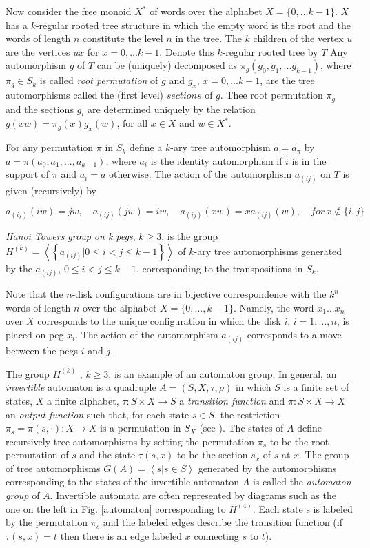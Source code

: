 \documentclass{article}
\begin{document}
Now consider the free monoid $X^*$ of words over the alphabet $X = \{0,... k-1\}$. $X$ has a 
$k$-regular rooted tree structure in which the empty word is the root and the 
words of length $n$ constitute the level $n$ in the tree. The $k$ children of the vertex $u$ 
are the vertices $u x$ for $x = 0, ... k-1$. Denote this $k$-regular rooted tree by $T$
Any automorphism $g$ of $T$ can be (uniquely) decomposed as
$\pi_g (g_0, g_1, ... g_{k-1})$, where $\pi_g \in S_{k}$ is called \textit{root permutation} of 
$g$ and $g_x, \, x = 0, ... k-1$, are the tree automorphisms called the (first level) $sections$
of $g$. Thee root permutation $\pi_g$ and the sections $g_i$ are determined uniquely by the 
relation $g(xw) = \pi_g (x) g_x (w)$, for all $x \in X$ and $w \in X^*$.

For any permutation $\pi$ in $S_k$ define a $k$-ary tree automorphism $a = a_\pi$ by 
$a = \pi (a_0 , a_1 , ... , a_{k-1} )$, where $a_i$ is the
identity automorphism if $i$ is in the support of $\pi$ and $a_i = a$ otherwise. 
The action of the automorphism $a_{(ij)}$ on $T$ is given (recursively) by

$$ 
a_{(ij)}(iw) = jw, \quad a_{(ij)}(jw) = iw, \quad a_{(ij)}(xw) = xa_{(ij)}(w), \quad for \, x \notin \{i, j\}
$$

\textit{Hanoi Towers group on k pegs}, $k \ge 3$, is the group 
$H^{(k)} = \left\langle \left\{ a_{(ij)} | 0 \le i < j \le k - 1 \right\}\right\rangle$ of $k$-ary tree automorphisms
generated by the $a_{(ij)} ,\, 0 \le i < j \le k - 1$, corresponding to the transpositions in $S_k$. 

Note that the $n$-disk configurations are in bijective correspondence with the 
$k^n$ words of length $n$ over the alphabet $X = \{0, ... , k - 1\}$. Namely, the
word $x_1 ... x_n$ over $X$ corresponds to the unique configuration in which the
disk $i$, $i = 1, ... , n$, is placed on peg $x_i$.
The action of the automorphism $a_{(ij)}$ corresponds to a move between the pegs $i$ and $j$.

The group $H^{(k)}$ , $k \ge 3$, is an example of an automaton group. In general, 
an \textit{invertible} automaton is a quadruple $A = (S, X, \tau, \rho)$ in which $S$ is 
a finite set of states, $X$ a finite alphabet, $\tau : S \times X \rightarrow S$ 
a \textit{transition function} and $\pi : S \times X \rightarrow X$ an \textit{output function} such
that, for each state $s \in S$, the restriction 
$\pi_s = \pi(s,\cdot) : X \rightarrow X$ is a permutation in $S_X$ (see \cite{Auto}). 
The states of $A$ define recursively tree automorphisms by setting the permutation $\pi_s$ 
to be the root permutation of $s$ and the state $\tau (s, x)$ to be the section $s_x$ of $s$ at $x$. 
The group of tree automorphisms $G(A) = \left\langle s | s \in S \right \rangle$
generated by the automorphisms corresponding to the states of the invertible automaton $A$ is 
called the \textit{automaton group} of $A$. Invertible automata are often represented by diagrams 
such as the one on the left in Fig. \ref{automaton} corresponding to $H^{(4)}$. Each state s is labeled by 
the permutation $\pi_s$ and the labeled edges describe the transition function (if
$\tau (s, x) = t$ then there is an edge labeled $x$ connecting $s$ to $t$).
\end{document}
